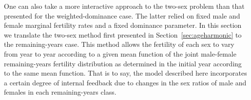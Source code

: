 \label{sec:ex2sexschoen}
One can also take a more interactive approach to the two-sex
problem than that presented for the weighted-dominance case. The latter relied
on fixed male and female marginal fertility rates and a fixed dominance
parameter. In this section we translate the two-sex method first presented in Section~\ref{sec:ageharmonic}
to the remaining-years case. This method allows the fertility of each sex to
vary from year to year according to a given mean function of the joint male-female remaining-years 
fertility distribution as determined in the initial year according to the same
mean function. That is to say, the model described here incorporates a certain
degree of internal feedback due to changes in the sex ratios of male and females
in each remaining-years class.



